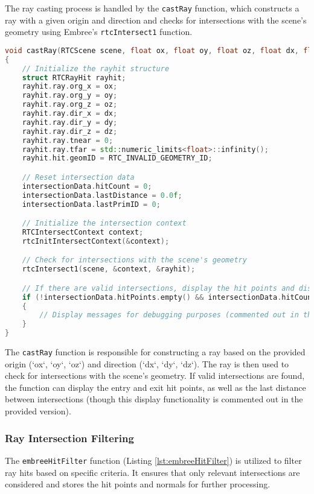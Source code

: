 The ray casting process is handled by the \texttt{castRay} function, which constructs a ray with a given origin and direction and checks for intersections with the scene's geometry using Embree's \texttt{rtcIntersect1} function.

\vspace{2mm}
\begin{lstlisting}[language=C++, caption={Ray casting using the \texttt{castRay} function to check for intersections with the scene's geometry.}, label=lst:castRay]
void castRay(RTCScene scene, float ox, float oy, float oz, float dx, float dy, float dz)
{
    // Initialize the rayhit structure
    struct RTCRayHit rayhit;
    rayhit.ray.org_x = ox;
    rayhit.ray.org_y = oy;
    rayhit.ray.org_z = oz;
    rayhit.ray.dir_x = dx;
    rayhit.ray.dir_y = dy;
    rayhit.ray.dir_z = dz;
    rayhit.ray.tnear = 0;
    rayhit.ray.tfar = std::numeric_limits<float>::infinity();
    rayhit.hit.geomID = RTC_INVALID_GEOMETRY_ID;

    // Reset intersection data
    intersectionData.hitCount = 0;
    intersectionData.lastDistance = 0.0f;
    intersectionData.lastPrimID = 0;

    // Initialize the intersection context
    RTCIntersectContext context;
    rtcInitIntersectContext(&context);

    // Check for intersections with the scene's geometry
    rtcIntersect1(scene, &context, &rayhit);

    // If there are valid intersections, display the hit points and distance
    if (!intersectionData.hitPoints.empty() && intersectionData.hitCount != 0 && ((intersectionData.hitCount / 2) * 2 == intersectionData.hitCount))
    {
        // Display messages for debugging purposes (commented out in this version)
    }
}
\end{lstlisting}
    
The \texttt{castRay} function is responsible for constructing a ray based on the provided origin (`ox`, `oy`, `oz`) and direction (`dx`, `dy`, `dz`). The ray is then used to check for intersections with the scene's geometry. If valid intersections are found, the function can display the entry and exit hit points, as well as the last distance between intersections (though this display functionality is commented out in the provided version).

\subsubsection{Ray Intersection Filtering} 
The \texttt{embreeHitFilter} function (Listing \ref{lst:embreeHitFilter}) is utilized to filter ray hits based on specific criteria. It ensures that only relevant intersections are considered and stores the hit points and normals for further processing.

